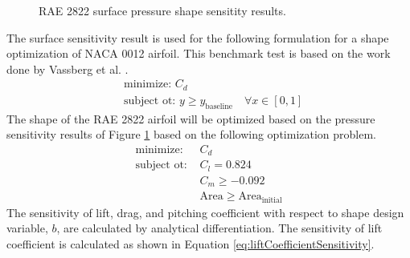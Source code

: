 \documentclass[12pt]{aiaa-pretty}
\begin{document}
\begin{figure}[H]
	\centering
	\quad
	\caption{RAE 2822 surface pressure shape sensitity results.}
	\label{fig:RAE2822sensitivity}
\end{figure}
%
The surface sensitivity result is used for the following formulation for a shape optimization of NACA 0012 airfoil. This benchmark test is based on the work done by Vassberg et al. \cite{vassberg2011systematic}.
%
\begin{align*}
	&\text{minimize: } C_d \\
	&\text{subject ot: } y \geq y_\text{baseline}  \quad \forall x \in [0, 1]
\end{align*}
%
The shape of the RAE 2822 airfoil will be optimized based on the pressure sensitivity results of Figure \ref{fig:RAE2822sensitivity} based on the following optimization problem.
%
\begin{align*}
	\text{minimize: } &C_d \\
	\text{subject ot: } &C_l = 0.824 \\
	&C_m \geq -0.092 \\
	&\text{Area} \geq \text{Area}_\text{initial}
\end{align*}
%
The sensitivity of lift, drag, and pitching coefficient with respect to shape design variable, $b$, are calculated by analytical differentiation. The sensitivity of lift coefficient is calculated as shown in Equation \eqref{eq:liftCoefficientSensitivity}.
\end{document}
